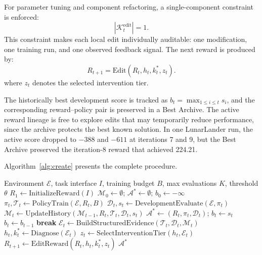 \documentclass[letterpaper,twocolumn,10pt]{article}
\begin{document}
For parameter tuning and component refactoring, a single-component constraint is enforced:
\begin{equation}
|\mathcal{K}_t^{\text{edit}}| = 1.
\label{eq:constraint}
\end{equation}
This constraint makes each local edit individually auditable: one modification, one training run, and one observed feedback signal. The next reward is produced by:
\begin{equation}
R_{t+1} = \text{Edit}(R_t, h_t, k_t^*, z_t).
\label{eq:edit}
\end{equation}
where $z_t$ denotes the selected intervention tier.

The historically best development score is tracked as $b_t = \max_{1 \leq i \leq t} s_i$, and the corresponding reward--policy pair is preserved in a Best Archive. The active reward lineage is free to explore edits that may temporarily reduce performance, since the archive protects the best known solution. In one LunarLander run, the active score dropped to $-388$ and $-611$ at iterations 7 and 9, but the Best Archive preserved the iteration-8 reward that achieved 224.21.

Algorithm~\ref{alg:create} presents the complete procedure.

\begin{algorithm}[t]
\caption{CREATE: Closed-Loop Reward Evolution}
\label{alg:create}
\begin{algorithmic}[1]
\REQUIRE Environment $\mathcal{E}$, task interface $I$, training budget $B$, max evaluations $K$, threshold $\theta$
\STATE $R_1 \leftarrow \text{InitializeReward}(I)$
\STATE $\mathcal{M}_0 \leftarrow \emptyset$; $\mathcal{A}^* \leftarrow \emptyset$; $b_0 \leftarrow -\infty$
    \STATE $\pi_t, \mathcal{T}_t \leftarrow \text{PolicyTrain}(\mathcal{E}, R_t, B)$
    \STATE $\mathcal{D}_t, s_t \leftarrow \text{DevelopmentEvaluate}(\mathcal{E}, \pi_t)$
    \STATE $\mathcal{M}_t \leftarrow \text{UpdateHistory}(\mathcal{M}_{t-1}, R_t, \mathcal{T}_t, \mathcal{D}_t, s_t)$
        \STATE $\mathcal{A}^* \leftarrow (R_t, \pi_t, \mathcal{D}_t)$; $b_t \leftarrow s_t$
    \ELSE
        \STATE $b_t \leftarrow b_{t-1}$
    \ENDIF
     \STATE \textbf{break} \ENDIF
    \STATE $\mathcal{E}_t \leftarrow \text{BuildStructuredEvidence}(\mathcal{T}_t, \mathcal{D}_t, \mathcal{M}_t)$
    \STATE $h_t, k_t^* \leftarrow \text{Diagnose}(\mathcal{E}_t)$
    \STATE $z_t \leftarrow \text{SelectInterventionTier}(h_t, \mathcal{E}_t)$
    \STATE $R_{t+1} \leftarrow \text{EditReward}(R_t, h_t, k_t^*, z_t)$
\ENDFOR
\RETURN $\mathcal{A}^*$ 
\end{algorithmic}
\end{algorithm}
\end{document}
